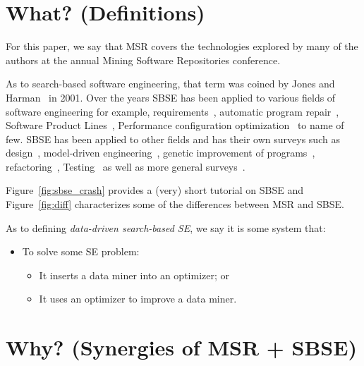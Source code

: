 \documentclass[sigconf,anonymous,review]{acmart}
\newcommand\TODO[1]{\textcolor{ScarletRed}{\textbf{\colorbox{yellow}{\small TODO:}} \emph{#1}}\xspace}
\begin{document}


\section{What? (Definitions)}

For this paper, we say that MSR covers the technologies
explored by many of the authors at the annual Mining Software Repositories
conference.

As to search-based software engineering, that term was coined by Jones and Harman~\cite{harman2001search} in 2001.
Over the years SBSE has been applied to various fields of software engineering for example, requirements~\cite{ZhangHL13, chen2017beyond}, automatic program repair~\cite{le2012genprog}, Software Product Lines~\cite{chen2017sampling, sayyad13a, guo2017smtibea}, Performance configuration optimization~\cite{nair2017faster,nair2017using, guo2017data, oh2017finding, nair2018finding} to name of few. SBSE has been applied to other fields and has their own surveys such as design~\cite{raiha2010survey}, model-driven engineering~\cite{boussaid2017survey}, genetic improvement of programs~\cite{petke2017genetic}, refactoring~\cite{mariani2017systematic}, Testing~\cite{silva2017systematic, khari2017extensive} as well as more general surveys~\cite{clarke2003reformulating, harman2007current}. 

 Figure~\ref{fig:sbse_crash} provides a (very) short tutorial on SBSE and  Figure~\ref{fig:diff} characterizes some of the differences between MSR 
and SBSE.
 
As to defining {\em data-driven search-based SE},
we say it is some system that:
\begin{itemize}
\item To solve  some SE problem:
\begin{itemize}
\item
It inserts  a data miner into an optimizer; or
\item
It uses an optimizer  to improve a data  miner.
\end{itemize}
\end{itemize}





\section{  Why? (Synergies of MSR + SBSE)} \label{sec:why}
\end{document}
